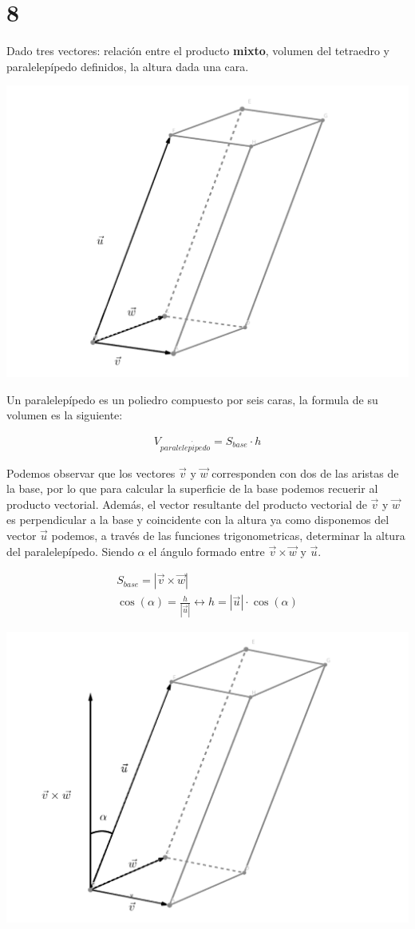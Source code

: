 \documentclass[
	12pt, %
	spanish, %
]{fphw}
\newcommand{\vu}{\vec{u}}
\newcommand{\vv}{\vec{v}}
\newcommand{\vw}{\vec{w}}
\begin{document}
\section*{8}
\begin{problem}
	Dado tres vectores: relación entre el producto \textbf{mixto}, volumen del
tetraedro y paralelepípedo definidos, la altura dada una cara.
\end{problem}

\begin{center}
	\includegraphics[width=0.5\columnwidth]{Paralelepipedo.png} %
\end{center}

Un paralelepípedo es un poliedro compuesto por seis caras, la formula de su volumen es la siguiente:

\begin{gather*}
	V_{paralelep\acute{i}pedo} = S_{base} \cdot h
\end{gather*}

Podemos observar que los vectores $\vv$ y $\vw$ corresponden con dos de las aristas de la base, por lo que para calcular la superficie de la base podemos recuerir al producto vectorial. Además, el vector resultante del producto vectorial de $\vv$ y $\vw$ es perpendicular a la base y  coincidente con la altura  ya  como disponemos del vector $\vu$ podemos, a través de las funciones trigonometricas, determinar la altura del paralelepípedo. Siendo $\alpha$ el ángulo formado entre $\vv \times \vw$ y $\vu$.

\begin{gather*}
	S_{base} = |\vv \times \vw|\\
	\cos(\alpha) = \frac{h}{|\vu|} \leftrightarrow h=|\vu| \cdot \cos(\alpha) 
\end{gather*}
 

\begin{center}
	\includegraphics[width=0.6\columnwidth]{geogebra-export.png} %
\end{center}
\end{document}
